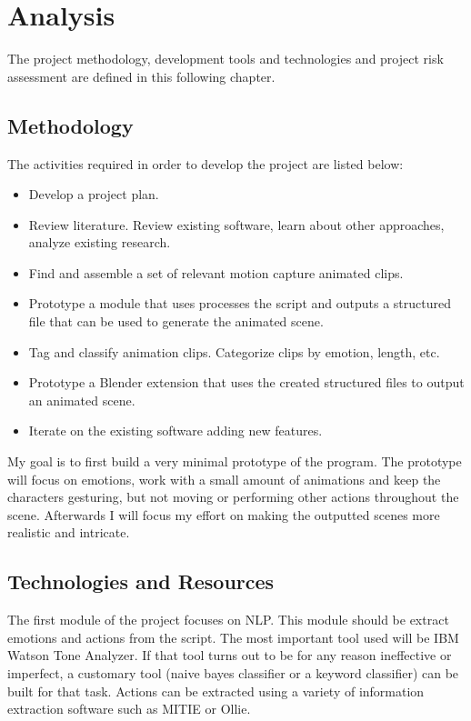 \chapter{Analysis \label{chap:analysis}}

\noindent The project  methodology,  development  tools  and  technologies  and  project  risk assessment are defined in this following chapter.


\section{Methodology}

The activities required in order to develop the project are listed below:

\begin{itemize}
\item Develop a project plan.
\item Review literature. Review existing software, learn about other approaches, analyze existing research.
\item Find and assemble a set of relevant motion capture animated clips.
\item Prototype a module that uses processes the script and outputs a structured file that can be used to generate the animated scene.
\item Tag and classify animation clips. Categorize clips by emotion, length, etc.
\item Prototype a Blender extension that uses the created structured files to output an animated scene.
\item Iterate on the existing software adding new features.
\end{itemize}

My goal is to first build a very minimal prototype of the program. The prototype will focus on emotions, work with a small amount of animations and keep the characters gesturing, but not moving or performing other actions throughout the scene. Afterwards I will focus my effort on making the outputted scenes more realistic and intricate.

\section{Technologies and Resources}

The first module of the project focuses on NLP. This module should be extract emotions and actions from the script. The most important tool used will be IBM Watson Tone Analyzer. If that tool turns out to be for any reason ineffective or imperfect, a customary tool (naive bayes classifier or a keyword classifier) can be built for that task. Actions can be extracted using a variety of information extraction software such as MITIE or Ollie.

